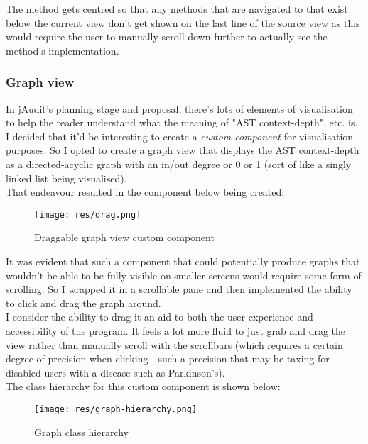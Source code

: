\documentclass[9pt]{article}
\begin{document}
			The method gets centred so that any methods that are navigated to
			that exist below the current view don't get shown on the last line
			of the source view as this would require the user to manually scroll
			down further to actually see the method's implementation.\\
			
		\subsubsection{Graph view}
			
			In jAudit's planning stage and proposal, there's lots of elements of
			visualisation to help the reader understand what the meaning of "AST
			context-depth", etc. is. I decided that it'd be interesting to
			create a \textit{custom component} for visualisation purposes. So I
			opted to create a graph view that displays the AST context-depth as
			a directed-acyclic graph with an in/out degree or 0 or 1 (sort of
			like a singly linked list being visualised).\\

			That endeavour resulted in the component below being created:\\

			\begin{figure}[H]
				\centering
				\texttt{[image: res/drag.png]}
				\caption{Draggable graph view custom component}
			\end{figure}

			It was evident that such a component that could potentially produce
			graphs that wouldn't be able to be fully visible on smaller screens
			would require some form of scrolling. So I wrapped it in a
			scrollable pane and then implemented the ability to click and drag
			the graph around.\\

			I consider the ability to drag it an aid to both the user experience
			and accessibility of the program. It feels a lot more fluid to just
			grab and drag the view rather than manually scroll with the
			scrollbars (which requires a certain degree of precision when
			clicking - such a precision that may be taxing for disabled users
			with a disease such as Parkinson's).\\

			The class hierarchy for this custom component is shown below:\\

			\begin{figure}[H]
				\centering
				\texttt{[image: res/graph-hierarchy.png]}
				\caption{Graph class hierarchy}
			\end{figure}
\end{document}
